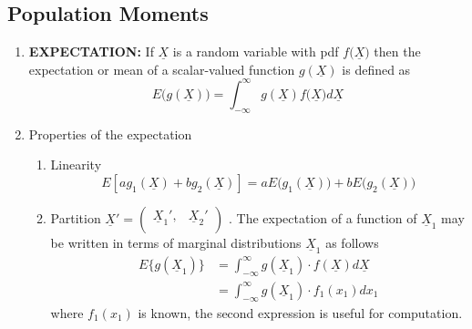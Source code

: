 \documentclass[11pt,a4paper]{article}
\theoremstyle{definition}
\begin{document}
\subsection{Population Moments}
\begin{enumerate}
\item[(A).] \textbf{EXPECTATION:} If $\underline{X}$ is a random variable with pdf $f\big(\underline{X}\big)$ then the expectation or mean of a scalar-valued function $g(\underline{X})$ is defined as \begin{equation}\tag{1}
E\Big(g(\underline{X})\Big) = \int^{\infty}_{-\infty} g(\underline{X})f\big(\underline{X}\big) d\underline{X}
\end{equation}
\item[(B).] Properties of the expectation 
\begin{enumerate}
          \item Linearity \begin{equation}\tag{2}
E[ag_1(\underline{X}) + b g_2(\underline{X})]= aE\Big(g_1(\underline{X})\Big) + bE\Big(g_2(\underline{X})\Big)
\end{equation}
          \item Partition $\underline{X}' = \begin{pmatrix}
          \underline{X}_1', & \underline{X}_2'\\
          \end{pmatrix}$ . The expectation of a function of $\underline{X}_1$ may be written in terms of marginal distributions $\underline{X}_1$ as follows 
\begin{align*}
E\big\{g(\underline{X}_1)\big\} & = \int^{\infty}_{-\infty} g(\underline{X}_1)\cdot f(\underline{X}) d\underline{X}\\
                                & = \int^{\infty}_{-\infty} g(\underline{X}_1)\cdot f_1(x_1)dx_1
\end{align*}
where $f_1(x_1)$ is known, the second expression is useful for computation.\\


\end{enumerate}
\end{enumerate}
\end{document}
